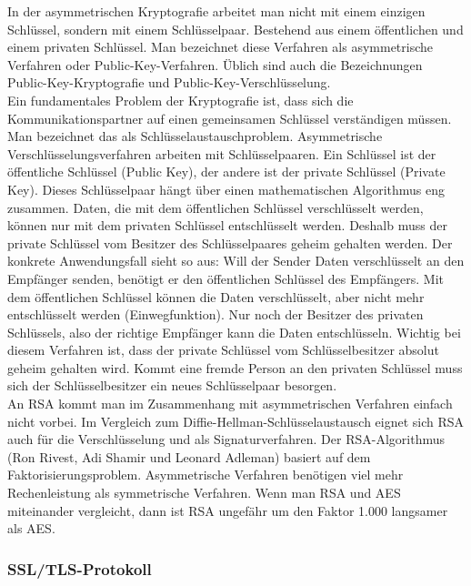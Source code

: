 \documentclass[letterpaper, 12pt]{article}
\let\tempsubsubsection\subsubsection
\renewcommand\subsubsection[1]{\vspace{0cm}\tempsubsubsection{#1}\vspace{0cm}}
\begin{document}
In der asymmetrischen Kryptografie arbeitet man nicht mit einem einzigen Schlüssel, sondern mit einem Schlüsselpaar. Bestehend aus einem öffentlichen und einem privaten Schlüssel. Man bezeichnet diese Verfahren als asymmetrische Verfahren oder Public-Key-Verfahren. Üblich sind auch die Bezeichnungen Public-Key-Kryptografie und Public-Key-Verschlüsselung. \\
Ein fundamentales Problem der Kryptografie ist, dass sich die Kommunikationspartner auf einen gemeinsamen Schlüssel verständigen müssen. Man bezeichnet das als Schlüsselaustauschproblem. Asymmetrische Verschlüsselungsverfahren arbeiten mit Schlüsselpaaren. Ein Schlüssel ist der öffentliche Schlüssel (Public Key), der andere ist der private Schlüssel (Private Key). Dieses Schlüsselpaar hängt über einen mathematischen Algorithmus eng zusammen. Daten, die mit dem öffentlichen Schlüssel verschlüsselt werden, können nur mit dem privaten Schlüssel entschlüsselt werden. Deshalb muss der private Schlüssel vom Besitzer des Schlüsselpaares geheim gehalten werden. Der konkrete Anwendungsfall sieht so aus: Will der Sender Daten verschlüsselt an den Empfänger senden, benötigt er den öffentlichen Schlüssel des Empfängers. Mit dem öffentlichen Schlüssel können die Daten verschlüsselt, aber nicht mehr entschlüsselt werden (Einwegfunktion). Nur noch der Besitzer des privaten Schlüssels, also der richtige Empfänger kann die Daten entschlüsseln. Wichtig bei diesem Verfahren ist, dass der private Schlüssel vom Schlüsselbesitzer absolut geheim gehalten wird. Kommt eine fremde Person an den privaten Schlüssel muss sich der Schlüsselbesitzer ein neues Schlüsselpaar besorgen. \\
An RSA kommt man im Zusammenhang mit asymmetrischen Verfahren einfach nicht vorbei. Im Vergleich zum Diffie-Hellman-Schlüsselaustausch eignet sich RSA auch für die Verschlüsselung und als Signaturverfahren. Der RSA-Algorithmus (Ron Rivest, Adi Shamir und Leonard Adleman) basiert auf dem Faktorisierungsproblem.
Asymmetrische Verfahren benötigen viel mehr Rechenleistung als symmetrische Verfahren. Wenn man RSA und AES miteinander vergleicht, dann ist RSA ungefähr um den Faktor 1.000 langsamer als AES. \cite{ausarbeitungsec}

\subsubsection{SSL/TLS-Protokoll}
\end{document}

